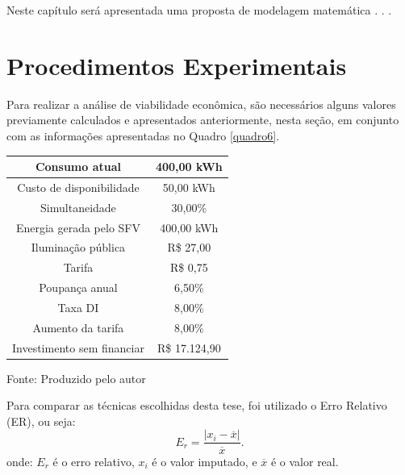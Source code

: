 \label{modelagem}

Neste capítulo  será apresentada uma proposta de modelagem matemática . . .


\section{Procedimentos Experimentais}
\label{Procedimentos Experimentais}


Para realizar a análise de viabilidade econômica, são necessários alguns valores previamente calculados e apresentados anteriormente, nesta seção, em  conjunto com as informações apresentadas no Quadro \ref{quadro6}.

\begin{quadro}[!ht]
  \centering
\caption{Dados a ser considerados para a simulação. }
\begin{tabular}{|c|c|}
\hline
Consumo   atual           & 400,00 kWh    \\ \hline
Custo de disponibilidade  & 50,00 kWh     \\ \hline
Simultaneidade            & 30,00\%       \\ \hline
Energia gerada pelo SFV    & 400,00 kWh    \\ \hline
Iluminação pública        & R\$ 27,00     \\ \hline
Tarifa                    & R\$ 0,75      \\ \hline
Poupança anual            & 6,50\%        \\ \hline
Taxa   DI             & 8,00\%       \\ \hline
Aumento da tarifa         & 8,00\%        \\ \hline

Investimento sem financiar & R\$ 17.124,90 \\ \hline
\end{tabular}
\label{quadro6}

Fonte: Produzido pelo autor
\end{quadro}



Para comparar as técnicas escolhidas desta tese, foi utilizado o Erro Relativo (ER), ou seja:
%
\begin{equation}
E_r=\frac{|x_i-\overline{x}|}{\overline{x}}.\label{eqerrorelativo}
\end{equation}
%
onde: $E_r$ é o erro relativo, $x_i$ é o valor imputado, e $\overline{x}$ é o valor real.

